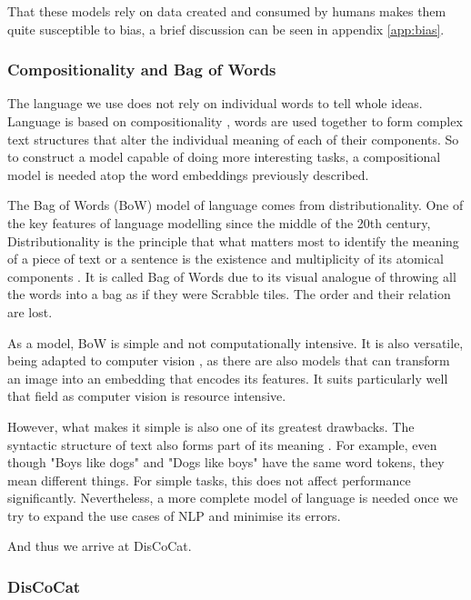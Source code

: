 That these models rely on data created and consumed by humans makes them quite susceptible to bias, a brief discussion can be seen in appendix \ref{app:bias}.

\subsubsection{Compositionality and Bag of Words}
The language we use does not rely on individual words to tell whole ideas. Language is based on compositionality \cite{moore_meaning_1993,riemer_routledge_2016}, words are used together to form complex text structures that alter the individual meaning of each of their components. So to construct a model capable of doing more interesting tasks, a compositional model is needed atop the word embeddings previously described.

The Bag of Words (BoW) model of language \cite{qader_overview_2019,zhang_understanding_2010} comes from distributionality. One of the key features of language modelling since the middle of the 20th century, Distributionality is the principle that what matters most to identify the meaning of a piece of text or a sentence is the existence and multiplicity of its atomical components \cite{harris_distributional_1954}. It is called Bag of Words due to its visual analogue of throwing all the words into a bag as if they were Scrabble tiles. The order and their relation are lost.

As a model, BoW is simple and not computationally intensive. It is also versatile, being adapted to computer vision \cite{qader_overview_2019}, as there are also models that can transform an image into an embedding that encodes its features. It suits particularly well that field as computer vision is resource intensive.

However, what makes it simple is also one of its greatest drawbacks. The syntactic structure of text also forms part of its meaning \cite{ives_notes_1964}. For example, even though "Boys like dogs" and "Dogs like boys" have the same word tokens, they mean different things. For simple tasks, this does not affect performance significantly. Nevertheless, a more complete model of language is needed once we try to expand the use cases of NLP and minimise its errors.

And thus we arrive at DisCoCat.

\subsubsection{DisCoCat}\label{sec:discocat}

